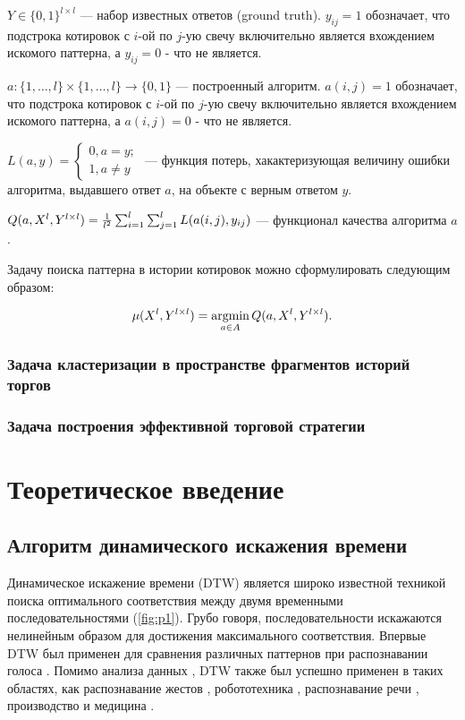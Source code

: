 \documentclass[a4paper, 14pt]{extarticle}
\numberwithin{figure}{subsection}
\let\oldautoref\autoref
\renewcommand{\autoref}[1]{(\oldautoref{#1})}
\numberwithin{equation}{subsection}
\begin{document}
$Y \in \{0, 1\}^{l \times l}$ --- набор известных ответов (ground truth). $y_{ij} = 1$ обозначает, что подстрока котировок с $i$-ой по $j$-ую свечу включительно является вхождением искомого паттерна, а $y_{ij} = 0$ - что не является.

$a: \{1, \dots, l\} \times \{1, \dots, l\} \rightarrow \{0, 1\}$ --- построенный алгоритм. $a(i, j) = 1$ обозначает, что подстрока котировок с $i$-ой по $j$-ую свечу включительно является вхождением искомого паттерна, а $a(i, j) = 0$ - что не является.

$L(a, y) = 
\begin{cases}
0, a = y;\\
1, a \ne y
\end{cases}$ --- функция потерь, хакактеризующая величину ошибки алгоритма, выдавшего ответ $a$, на объекте с верным ответом $y$.

$Q(a, X^l, Y^{l \times l}) = {1 \over {l^2}}\sum_{i=1}^l\sum_{j=1}^l L(a(i, j), y_{ij})$ --- функционал качества алгоритма $a$.

Задачу поиска паттерна в истории котировок можно сформулировать следующим образом:

\begin{equation}
	\mu(X^l, Y^{l \times l}) = \operatornamewithlimits{argmin}\limits_{a \in A} Q(a, X^l, Y^{l \times l}).
\end{equation}

\subsubsection{Задача кластеризации в пространстве фрагментов историй торгов}
\subsubsection{Задача построения эффективной торговой стратегии}
\section{Теоретическое введение}
\subsection{Алгоритм динамического искажения времени}
Динамическое искажение времени (DTW) является широко известной техникой поиска оптимального соответствия между двумя временными последовательностями \autoref{fig:p1}. Грубо говоря, последовательности искажаются нелинейным образом для достижения максимального соответствия. Впервые DTW был применен для сравнения различных паттернов при распознавании голоса \cite{wjb87}. Помимо анализа данных \cite{keogh2000scaling, yi1998efficient, berndt1994using}, DTW также был успешно применен в таких областях, как распознавание жестов \cite{gavrila1995towards}, робототехника \cite{schmill1999learned}, распознавание речи \cite{rabiner1993fundamentals}, производство \cite{gollmer1995detection} и медицина \cite{caiani1998warped}.
\end{document}
